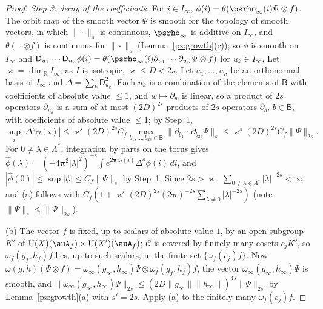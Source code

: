 \documentclass[10pt]{amsart}
\theoremstyle{definition}
\theoremstyle{remark}
\newcommand{\R}{\mathbb R}
\providecommand{\auU}{\mathrm U}
\begin{document}
\begin{proof}
\emph{Step 3: decay of the coefficients.} For $i\in I_\infty$, $\phi(i)=\theta(\psrho_\infty(i)\Psi\otimes
f)$. The orbit map of the smooth vector $\Psi$ is smooth for the topology of smooth vectors, in which
$\|\cdot\|_s$ is continuous, $\psrho_\infty$ is additive on $I_\infty$, and $\theta(\,\cdot\otimes f)$ is
continuous for $\|\cdot\|_s$ (Lemma~\ref{pz:growth}(c)); so $\phi$ is smooth on $I_\infty$ and
$\mathsf D_{u_1}\cdots\mathsf D_{u_n}\phi(i)=\theta(\psrho_\infty(i)\partial_{u_1}\cdots\partial_{u_n}\Psi\otimes f)$
for $u_k\in I_\infty$. Let $\varkappa=\dim_\R I_\infty$; as $I$ is isotropic, $\varkappa\le D<2s$. Let
$u_1,\dots,u_\varkappa$ be an orthonormal basis of $I_\infty$ and $\Delta=\sum_k\mathsf D_{u_k}^2$. Each $u_k$ is a
combination of the elements of $\mathsf B$ with coefficients of absolute value $\le1$, and $w\mapsto
\partial_w$ is linear, so a product of $2s$ operators $\partial_{u_k}$ is a sum of at most $(2D)^{2s}$
products of $2s$ operators $\partial_b$, $b\in\mathsf B$, with coefficients of absolute value $\le1$; by
Step~1,
\[
\sup_{i}|\Delta^s\phi(i)|\le\varkappa^s(2D)^{2s}C_f\max_{b_1,\dots,b_{2s}\in\mathsf B}\|\partial_{b_1}\cdots
\partial_{b_{2s}}\Psi\|_s\le\varkappa^s(2D)^{2s}C_f\|\Psi\|_{2s}.
\]
For $0\ne\lambda\in\Lambda^*$, integration by parts on the torus gives $\hat\phi(\lambda)=(-4\boldsymbol\pi^2
|\lambda|^2)^{-s}\int e^{2\boldsymbol\pi i\lambda(i)}\Delta^s\phi(i)\,di$, and $|\hat\phi(0)|\le\sup|\phi|\le C_f
\|\Psi\|_s$ by Step~1. Since $2s>\varkappa$, $\sum_{0\ne\lambda\in\Lambda^*}|\lambda|^{-2s}<\infty$, and (a)
follows with $C_f(1+\varkappa^s(2D)^{2s}(2\boldsymbol\pi)^{-2s}\sum_{\lambda\ne0}|\lambda|^{-2s})$ (note
$\|\Psi\|_s\le\|\Psi\|_{2s}$).

(b) The vector $f$ is fixed, up to scalars of absolute value $1$, by an open subgroup $K'$ of
$\auU(X)(\auA_f)\times\auU(X')(\auA_f)$; $\mathcal C$ is covered by finitely many cosets $c_jK'$, so
$\omega_f(g_f,h_f)f$ lies, up to such scalars, in the finite set $\{\omega_f(c_j)f\}$. Now
$\omega(g,h)(\Psi\otimes f)=\omega_\infty(g_\infty,h_\infty)\Psi\otimes\omega_f(g_f,h_f)f$, the vector
$\omega_\infty(g_\infty,h_\infty)\Psi$ is smooth, and $\|\omega_\infty(g_\infty,h_\infty)\Psi\|_{2s}\le
(2D\|g_\infty\|\|h_\infty\|)^{4s}\|\Psi\|_{2s}$ by Lemma~\ref{pz:growth}(a) with $s'=2s$. Apply (a) to the
finitely many $\omega_f(c_j)f$.


\end{proof}
\end{document}
